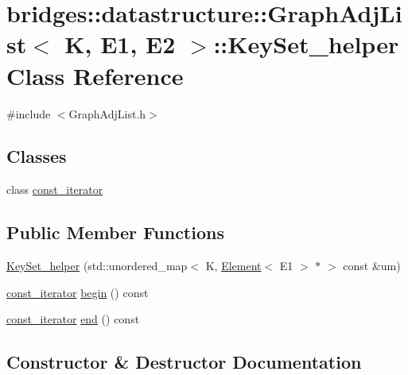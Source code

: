 \hypertarget{classbridges_1_1datastructure_1_1_graph_adj_list_1_1_key_set__helper}{}\section{bridges\+:\+:datastructure\+:\+:Graph\+Adj\+List$<$ K, E1, E2 $>$\+:\+:Key\+Set\+\_\+helper Class Reference}
\label{classbridges_1_1datastructure_1_1_graph_adj_list_1_1_key_set__helper}


{\ttfamily \#include $<$Graph\+Adj\+List.\+h$>$}

\subsection*{Classes}
\begin{DoxyCompactItemize}
\item 
class \hyperlink{classbridges_1_1datastructure_1_1_graph_adj_list_1_1_key_set__helper_1_1const__iterator}{const\+\_\+iterator}
\end{DoxyCompactItemize}
\subsection*{Public Member Functions}
\begin{DoxyCompactItemize}
\item 
\hyperlink{classbridges_1_1datastructure_1_1_graph_adj_list_1_1_key_set__helper_a62d14661afdef7ae642c3f1d47ddc871}{Key\+Set\+\_\+helper} (std\+::unordered\+\_\+map$<$ K, \hyperlink{classbridges_1_1datastructure_1_1_element}{Element}$<$ E1 $>$ $\ast$ $>$ const \&um)
\item 
\hyperlink{classbridges_1_1datastructure_1_1_graph_adj_list_1_1_key_set__helper_1_1const__iterator}{const\+\_\+iterator} \hyperlink{classbridges_1_1datastructure_1_1_graph_adj_list_1_1_key_set__helper_a862efabcacc55dab2c383485fb10fd85}{begin} () const
\item 
\hyperlink{classbridges_1_1datastructure_1_1_graph_adj_list_1_1_key_set__helper_1_1const__iterator}{const\+\_\+iterator} \hyperlink{classbridges_1_1datastructure_1_1_graph_adj_list_1_1_key_set__helper_a6204f2d6c81b2b4cc72387cbce6c4f0d}{end} () const
\end{DoxyCompactItemize}


\subsection{Constructor \& Destructor Documentation}
\mbox{\label{classbridges_1_1datastructure_1_1_graph_adj_list_1_1_key_set__helper_a62d14661afdef7ae642c3f1d47ddc871}} 
